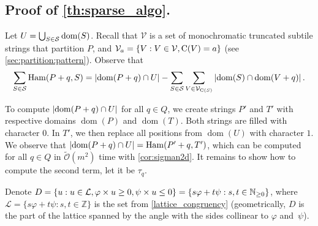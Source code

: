 \documentclass[a4paper,11pt]{article}
\let\Cref\cref
\newcommand{\tO}{\tilde{\mathcal{O}}}
\renewcommand{\S}{\mathcal{S}}
\newcommand{\V}{\mathcal{V}}
\renewcommand{\L}{\mathcal{L}}
\renewcommand{\phi}{\varphi}
\newcommand{\set}[1]{\left\lbrace #1 \right\rbrace}
\DeclareMathOperator*{\Ham}{Ham}
\DeclareMathOperator*{\dom}{dom}
\newcommand{\absolute}[1]{\left\lvert#1\right\rvert}
\begin{document}
\subsection[Counting mismatches between P and monochromatic subtile strings.]{Proof of \cref{th:sparse_algo}.}\label{sec:algorithm:center}
\restateThmSparseAlgo*
Let $U = \bigcup_{S \in \S} \d{S}$. Recall that $\V$ is a set of monochromatic truncated subtile strings that partition $P$, and $\V_a = \set{V : V \in \V, \getchar{V} = a}$ (see \cref{sec:partition:pattern}).
 Observe that
\begin{align}
\label{eq:sparse}
\sum_{S \in \S} \Ham(P + q, S) = \absolute{\d{P + q} \cap U} - \sum_{S \in \S}\sum_{V \in \V_{\getchar{S}}} \absolute{\d{S} \cap \d{V + q}}.
\end{align}

To compute $\absolute{\d{P + q} \cap U}$ for all $q \in Q$, we create strings $P'$ and $T'$ with respective domains $\dom(P)$ and $\dom(T)$. Both strings are filled with character $0$. 
In $T'$, we then replace all positions from $\dom(U)$ with character $1$. 
We observe that $\absolute{\d{P + q} \cap U} = \Ham(P' + q, T')$, which can be computed for all $q \in Q$ in $\tO(m^2)$ time with \cref{cor:sigman2d}.
It remains to show how to compute the second term, let it be $\tau_q$. 

Denote $D = \set{u : u \in \L, \h{u} \ge 0, \s{u} \le 0} = \{ s\phi + t\psi : s,t \in \mathbb N_{\geq 0}\}$, where $\L = \{ s\phi + t\psi : s,t \in \mathbb Z\}$ is the set from \Cref{lattice_congruency} (geometrically, $D$ is the part of the lattice spanned by the angle with the sides collinear to $\phi$ and~$\psi$).
\end{document}
